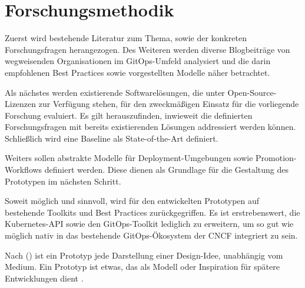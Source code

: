 \chapter{Forschungsmethodik}

Zuerst wird bestehende Literatur zum Thema, 
sowie der konkreten Forschungsfragen herangezogen.
Des Weiteren werden
diverse Blogbeiträge von wegweisenden Organisationen im GitOps-Umfeld analysiert
und die darin empfohlenen Best Practices sowie vorgestellten Modelle näher betrachtet.
\bigskip

\noindent
Als nächstes werden existierende Softwarelösungen,
die unter Open-Source-Lizenzen zur Verfügung stehen,
für den zweckmäßigen Einsatz für die vorliegende Forschung evaluiert.
Es gilt herauszufinden, inwieweit die definierten Forschungsfragen
mit bereits existierenden Lösungen
addressiert werden können.
Schließlich wird eine Baseline als State-of-the-Art definiert.
\bigskip

\noindent
Weiters sollen abstrakte Modelle für Deployment-Umgebungen
sowie Promotion-Workflows definiert werden.
Diese dienen als Grundlage für die Gestaltung des Prototypen
im nächsten Schritt.
\bigskip

\noindent
Soweit möglich und sinnvoll, wird für den entwickelten Prototypen
auf bestehende Toolkits und Best Practices zurückgegriffen.
Es ist erstrebenswert,
die Kubernetes-API
sowie den
GitOps-Toolkit
lediglich zu erweitern,
um so gut wie möglich nativ in das bestehende GitOps-Ökosystem 
der CNCF
integriert zu sein.
\bigskip

\noindent
Nach 
\citeauthor{HOUDE1997367} (\citeyear{HOUDE1997367})
ist ein Prototyp jede Darstellung einer Design-Idee, unabhängig vom Medium.
Ein Prototyp ist etwas, das als Modell oder Inspiration für spätere Entwicklungen dient
\autocite{HOUDE1997367}.
\bigskip







